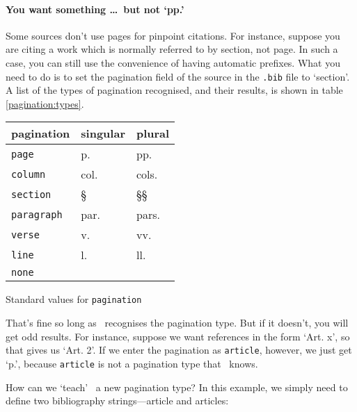 \paragraph{You want something \ldots\ but not `pp.'} Some sources
don't use pages for pinpoint citations. For instance, suppose you are
citing a work which is normally referred to by section, not page. In
such a case, you can still use the convenience of having automatic
prefixes. What you need to do is to set the pagination field of the
source in the \texttt{.bib} file to `section'. A list of the types of
pagination recognised, and their results, is shown in table
\ref{pagination:types}.
\begin{margintable}
\begin{tabular}{lll}
  \toprule
  \textsf{pagination} & \textsf{singular} & \textsf{plural} \\
  \midrule
  \texttt{page}       & p.                & pp.             \\
  \texttt{column}     & col.              & cols.           \\
  \texttt{section}    & \S                & \S\S            \\
  \texttt{paragraph}  & par.              & pars.           \\
  \texttt{verse}      & v.                & vv.             \\
  \texttt{line}       & l.                & ll.             \\
  \texttt{none}                                             \\
  \bottomrule
\end{tabular}
\vspace{3pt}
\caption{Standard values for \texttt{pagination}\label{pagination:types}}
\end{margintable}


That’s fine so long as \biblatex\ recognises the pagination type. But if
it doesn’t, you will get odd results. For instance, suppose we want
references in the form `Art. x', so that  gives us
`Art. 2'. If we enter the pagination as \texttt{article}, however, we
just get `p.', because \texttt{article} is not a
pagination type that \biblatex\ knows.

How can we `teach' \biblatex\ a new pagination type? In this example,
we simply need to define two bibliography strings---article and
articles:

